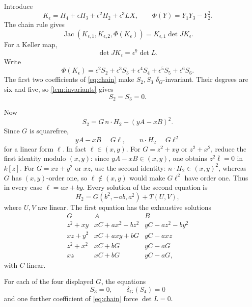 \documentclass[11pt,reqno]{amsart}
\begin{document}
Introduce
\[
K_\epsilon=H_4+\epsilon H_3+\epsilon^2H_2+\epsilon^3LX,
\qquad
\Phi(Y)=Y_1Y_3-Y_2^2.
\]
The chain rule gives
\begin{equation}
\label{eq:chain}
\operatorname{Jac}(K_{\epsilon,1},K_{\epsilon,2},
\Phi(K_\epsilon))
=K_{\epsilon,1}\det JK_\epsilon.
\end{equation}
For a Keller map,
\[
\det JK_\epsilon=\epsilon^9\det L.
\]
Write
\[
\Phi(K_\epsilon)=
\epsilon^2S_2+\epsilon^3S_3+\epsilon^4S_4+
\epsilon^5S_5+\epsilon^6S_6.
\]
The first two coefficients of \eqref{eq:chain} make \(S_2,S_3\)
\(\delta_G\)-invariant.  Their degrees are six and five, so
\cref{lem:invariants} gives
\[
S_2=S_3=0.
\]

Now
\[
S_2=G\,n\cdot H_2-(yA-xB)^2.
\]
Since \(G\) is squarefree,
\begin{equation}
\label{eq:divisibility}
yA-xB=G\ell,\qquad n\cdot H_2=G\ell^2
\end{equation}
for a linear form \(\ell\).  In fact \(\ell\in(x,y)\).  For
\(G=z^2+xy\) or \(z^2+x^2\), reduce the first identity modulo
\((x,y)\): since \(yA-xB\in(x,y)\), one obtains
\(z^2\overline{\ell}=0\) in \(k[z]\).  For \(G=xz+y^2\) or \(xz\), use
the second identity: \(n\cdot H_2\in(x,y)^2\), whereas \(G\) has
\((x,y)\)-order one, so \(\ell\notin(x,y)\) would make
\(G\ell^2\) have order one.  Thus in every case
\(\ell=ax+by\).  Every solution of the second equation is
\[
H_2=G(b^2,-ab,a^2)+T(U,V),
\]
where \(U,V\) are linear.  The first equation has the exhaustive solutions
\[
\begin{array}{c|c|c}
G&A&B\\ \hline
z^2+xy&xC+ax^2+bz^2&yC-az^2-by^2\\
xz+y^2&xC+axy+bG&yC-axz\\
z^2+x^2&xC+bG&yC-aG\\
xz&xC+bG&yC-aG,
\end{array}
\]
with \(C\) linear.

\begin{proposition}
\label{prop:terminal-conic}
For each of the four displayed \(G\), the equations
\[
S_3=0,\qquad \delta_G(S_4)=0
\]
and one further coefficient of \eqref{eq:chain} force \(\det L=0\).
\end{proposition}
\end{document}
